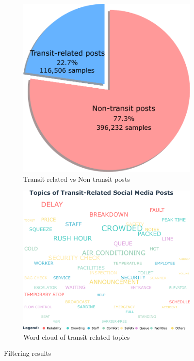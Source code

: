 \documentclass[a4paper,fleqn,12pt]{cas-sc}
\begin{document}
\begin{figure}[!ht]
\centering
\begin{subfigure}[b]{0.4\textwidth}
    \centering
    \includegraphics[width=\textwidth]{figs/filtering_results_pie_chart.pdf}
    \caption{Transit-related vs Non-transit posts}
    \label{fig:filtering_pie}
\end{subfigure}
\hfill
\begin{subfigure}[b]{0.48\textwidth}
    \centering
    \includegraphics[width=\textwidth]{figs/wordcloud.pdf}
    \caption{Word cloud of transit-related topics}
    \label{fig:wordcloud}
\end{subfigure}
\caption{Filtering results}
\label{fig:filtering_results}
\end{figure}
\end{document}
